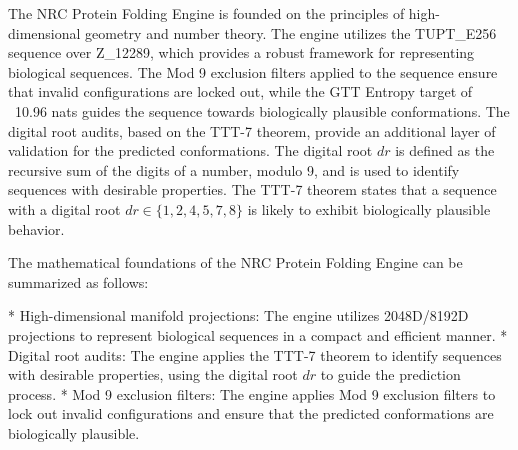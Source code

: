 The NRC Protein Folding Engine is founded on the principles of high-dimensional geometry and number theory. The engine utilizes the TUPT_E256 sequence over Z_12289, which provides a robust framework for representing biological sequences. The Mod 9 exclusion filters applied to the sequence ensure that invalid configurations are locked out, while the GTT Entropy target of ~10.96 nats guides the sequence towards biologically plausible conformations. The digital root audits, based on the TTT-7 theorem, provide an additional layer of validation for the predicted conformations. The digital root $dr$ is defined as the recursive sum of the digits of a number, modulo 9, and is used to identify sequences with desirable properties. The TTT-7 theorem states that a sequence with a digital root $dr \in \{1, 2, 4, 5, 7, 8\}$ is likely to exhibit biologically plausible behavior.

The mathematical foundations of the NRC Protein Folding Engine can be summarized as follows:

* High-dimensional manifold projections: The engine utilizes 2048D/8192D projections to represent biological sequences in a compact and efficient manner.
* Digital root audits: The engine applies the TTT-7 theorem to identify sequences with desirable properties, using the digital root $dr$ to guide the prediction process.
* Mod 9 exclusion filters: The engine applies Mod 9 exclusion filters to lock out invalid configurations and ensure that the predicted conformations are biologically plausible.